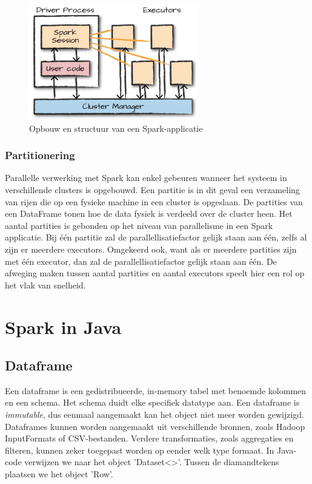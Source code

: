 \documentclass[a4paper,10pt,twoside]{report}
\begin{document}
\begin{figure}
	\begin{center}
		\includegraphics[height=5cm]{images/Screenshot_258.png}
	\end{center}
	\caption{Opbouw en structuur van een Spark-applicatie}
\end{figure}


\subsubsection{Partitionering}

Parallelle verwerking met Spark kan enkel gebeuren wanneer het systeem in verschillende clusters is opgebouwd. Een partitie is in dit geval een verzameling van rijen die op een fysieke machine in een cluster is opgeslaan. De partities van een DataFrame tonen hoe de data fysiek is verdeeld over de cluster heen. Het aantal partities is gebonden op het niveau van parallelisme in een Spark applicatie. Bij één partitie zal de parallellisatiefactor gelijk staan aan één, zelfs al zijn er meerdere executors. Omgekeerd ook, want als er meerdere partities zijn met één executor, dan zal de parallellisatiefactor gelijk staan aan één. De afweging maken tussen aantal partities en aantal executors speelt hier een rol op het vlak van snelheid.

\section{Spark in Java}

\subsection{Dataframe}

Een dataframe is een gedistribueerde, in-memory tabel met benoemde kolommen en een schema. Het schema duidt elke specifiek datatype aan. Een dataframe is \textit{immutable}, dus eenmaal aangemaakt kan het object niet meer worden gewijzigd. Dataframes kunnen worden aangemaakt uit verschillende bronnen, zoals Hadoop InputFormats of CSV-bestanden. Verdere transformaties, zoals aggregaties en filteren, kunnen zeker toegepast worden op eender welk type formaat. In Java-code verwijzen we naar het object 'Dataset<>'. Tussen de diamandtekens plaatsen we het object 'Row'.
\end{document}
